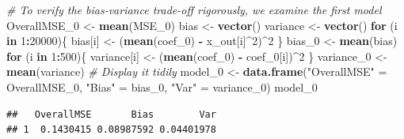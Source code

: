 \documentclass[]{article}
\newenvironment{Shaded}{\begin{snugshade}}{\end{snugshade}}
\newcommand{\KeywordTok}[1]{\textcolor[rgb]{0.13,0.29,0.53}{\textbf{#1}}}
\newcommand{\DecValTok}[1]{\textcolor[rgb]{0.00,0.00,0.81}{#1}}
\newcommand{\StringTok}[1]{\textcolor[rgb]{0.31,0.60,0.02}{#1}}
\newcommand{\CommentTok}[1]{\textcolor[rgb]{0.56,0.35,0.01}{\textit{#1}}}
\newcommand{\ControlFlowTok}[1]{\textcolor[rgb]{0.13,0.29,0.53}{\textbf{#1}}}
\newcommand{\OperatorTok}[1]{\textcolor[rgb]{0.81,0.36,0.00}{\textbf{#1}}}
\newcommand{\NormalTok}[1]{#1}
\begin{document}
\begin{Shaded}
\begin{Highlighting}[]
\CommentTok{# To verify the bias-variance trade-off rigorously, we examine the first model}
\NormalTok{OverallMSE_}\DecValTok{0}\NormalTok{ <-}\StringTok{ }\KeywordTok{mean}\NormalTok{(MSE_}\DecValTok{0}\NormalTok{)}
\NormalTok{bias <-}\StringTok{ }\KeywordTok{vector}\NormalTok{()}
\NormalTok{variance <-}\StringTok{ }\KeywordTok{vector}\NormalTok{()}
\ControlFlowTok{for}\NormalTok{ (i }\ControlFlowTok{in} \DecValTok{1}\OperatorTok{:}\DecValTok{20000}\NormalTok{)\{}
\NormalTok{  bias[i] <-}\StringTok{ }\NormalTok{(}\KeywordTok{mean}\NormalTok{(coef_}\DecValTok{0}\NormalTok{) }\OperatorTok{-}\StringTok{ }\NormalTok{x_out[i]}\OperatorTok{^}\DecValTok{2}\NormalTok{)}\OperatorTok{^}\DecValTok{2}
\NormalTok{\}}
\NormalTok{bias_}\DecValTok{0}\NormalTok{ <-}\StringTok{ }\KeywordTok{mean}\NormalTok{(bias)}
\ControlFlowTok{for}\NormalTok{ (i }\ControlFlowTok{in} \DecValTok{1}\OperatorTok{:}\DecValTok{500}\NormalTok{)\{}
\NormalTok{  variance[i] <-}\StringTok{ }\NormalTok{(}\KeywordTok{mean}\NormalTok{(coef_}\DecValTok{0}\NormalTok{) }\OperatorTok{-}\StringTok{ }\NormalTok{coef_}\DecValTok{0}\NormalTok{[i])}\OperatorTok{^}\DecValTok{2}
\NormalTok{\}}
\NormalTok{variance_}\DecValTok{0}\NormalTok{ <-}\StringTok{ }\KeywordTok{mean}\NormalTok{(variance)}
\CommentTok{# Display it tidily}
\NormalTok{model_}\DecValTok{0}\NormalTok{ <-}\StringTok{ }\KeywordTok{data.frame}\NormalTok{(}\StringTok{"OverallMSE"}\NormalTok{ =}\StringTok{ }\NormalTok{OverallMSE_}\DecValTok{0}\NormalTok{, }\StringTok{"Bias"}\NormalTok{ =}\StringTok{ }\NormalTok{bias_}\DecValTok{0}\NormalTok{, }\StringTok{"Var"}\NormalTok{ =}\StringTok{ }\NormalTok{variance_}\DecValTok{0}\NormalTok{)}
\NormalTok{model_}\DecValTok{0}
\end{Highlighting}
\end{Shaded}

\begin{verbatim}
##   OverallMSE       Bias        Var
## 1  0.1430415 0.08987592 0.04401978
\end{verbatim}

\begin{Shaded}
\end{Shaded}
\end{document}
